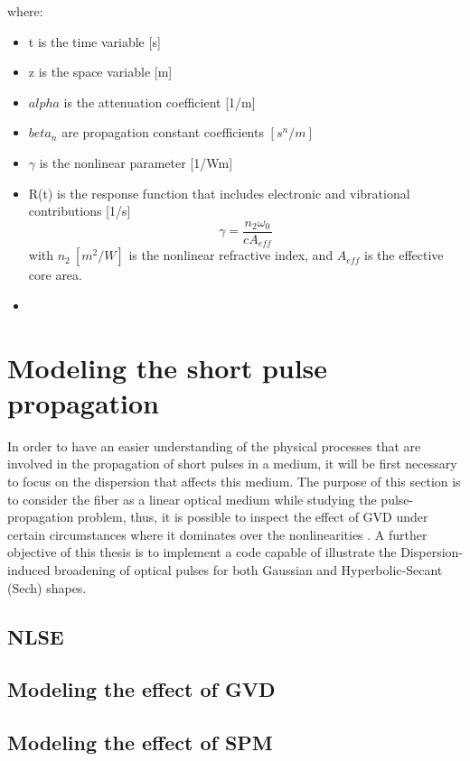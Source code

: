     where: 
\begin{itemize}
    \item t is the time variable [s]
    \item z is the space variable [m]
    \item $alpha$ is the attenuation coefficient [1/m]
    \item $beta_n$ are propagation constant coefficients $[s^n/m]$
    \item $\gamma$ is the nonlinear parameter [1/Wm]
    \item R(t) is the response function that includes electronic and vibrational contributions [1/s]
        \begin{equation}
            \gamma = \frac{n_2 \omega_0}{c A_{eff}}
            \label{eq_gamma}
        \end{equation}
    with $n_2 \ [m^2/W]$ is the nonlinear refractive index, and $A_{eff}$  is the  effective core area.
    \item 
\end{itemize}

    \section{Modeling the short  pulse propagation}
    In order to have an easier understanding of the physical processes that are involved in the propagation of short pulses in a medium, it will be first necessary to focus on the dispersion that affects this medium. The purpose of this section is to consider the fiber as a linear optical medium while studying the pulse-propagation problem, thus, it is possible to inspect the effect of GVD under certain circumstances where it dominates over the nonlinearities \citep{ AgrawalBook}. A further objective of this thesis is to implement a code capable of illustrate the Dispersion-induced broadening of optical pulses for both Gaussian and Hyperbolic-Secant (Sech) shapes.
    
        \subsection{NLSE}
        
        \subsection{Modeling the effect of GVD}
        \subsection{Modeling the effect of SPM}
        

